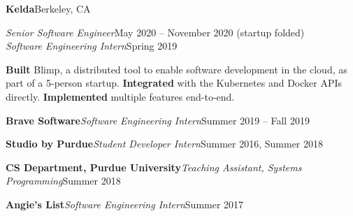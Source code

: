   \vspace{5pt}
  \textbf{Kelda}\hfill Berkeley, CA
  \begin{adjustwidth}{10pt}{}
    \emph{Senior Software Engineer}\hfill May 2020 -- November 2020 (startup folded)\\
    \emph{Software Engineering Intern}\hfill Spring 2019

    \textbf{Built} Blimp, a distributed tool to enable software development in the cloud, as part of a 5-person startup.
    \textbf{Integrated} with the Kubernetes and Docker APIs directly.
    \textbf{Implemented} multiple features end-to-end. %
  \end{adjustwidth}

  \vspace{5pt}
  \textbf{Brave Software}\quad\emph{Software Engineering Intern}\hfill Summer 2019 -- Fall 2019


  \textbf{Studio by Purdue}\quad\emph{Student Developer Intern}\hfill Summer 2016, Summer 2018


  \textbf{CS Department, Purdue University}\quad\emph{Teaching Assistant, Systems Programming}\hfill Summer 2018


  \textbf{Angie's List}\quad\emph{Software Engineering Intern}\hfill Summer 2017

